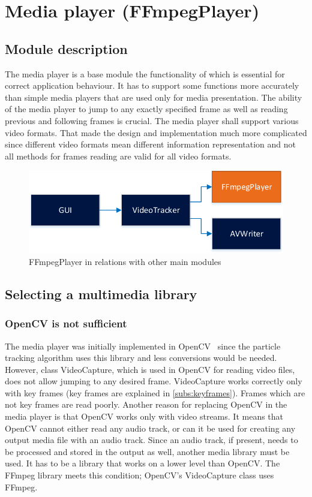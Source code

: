 \chapter{Media player (FFmpegPlayer)}\label{ch:ffmpegplayer}
\section{Module description}
The media player is a base module the functionality of which is essential for correct application behaviour. It has to support some functions more accurately than simple media players that are used only for media presentation. The ability of the media player to jump to any exactly specified frame as well as reading previous and following frames is crucial. The media player shall support various video formats. That made the design and implementation much more complicated since different video formats mean different information representation and not all methods for frames reading are valid for all video formats.
\begin{figure}[!htbp]
\centering
\includegraphics{fig/ffmpegplayer}
\caption{FFmpegPlayer in relations with other main modules}
\label{fig:ffmpegplayer}
\end{figure}

\section{Selecting a multimedia library}
\subsection{OpenCV is not sufficient}
The media player was initially implemented in OpenCV~\cite{opencv_essentials} since the particle tracking algorithm uses this library and less conversions would be needed. However, class VideoCapture, which is used in OpenCV for reading video files, does not allow jumping to any desired frame. VideoCapture works correctly only with key frames (key frames are explained in \autoref{subs:keyframes}). Frames which are not key frames are read poorly. Another reason for replacing OpenCV in the media player is that OpenCV works only with video streams. It means that OpenCV cannot either read any audio track, or can it be used for creating any output media file with an audio track. Since an audio track, if present, needs to be processed and stored in the output as well, another media library must be used. It has to be a library that works on a lower level than OpenCV. The FFmpeg library meets this condition; OpenCV's VideoCapture class uses FFmpeg.

